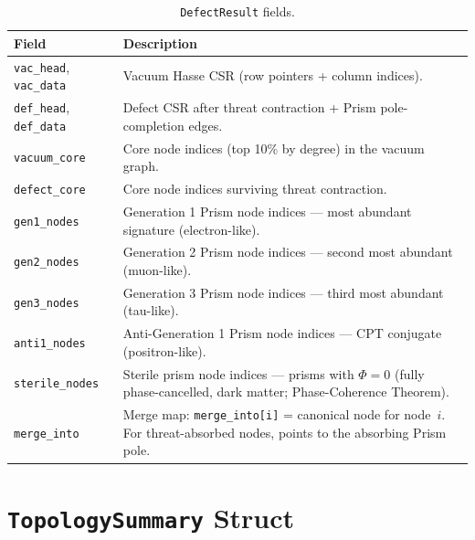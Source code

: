 \documentclass[11pt, a4paper, openany]{book}
\newcommand{\code}[1]{\texttt{#1}}
\begin{document}
\begin{table}[H]
\centering
\begin{tabular}{@{} l p{9cm} @{}}
\toprule
\textbf{Field} & \textbf{Description} \\
\midrule
\code{vac\_head}, \code{vac\_data}   & Vacuum Hasse CSR (row pointers + column indices). \\
\code{def\_head}, \code{def\_data}   & Defect CSR after threat contraction + Prism pole-completion edges. \\
\code{vacuum\_core}                  & Core node indices (top 10\% by degree) in the vacuum graph. \\
\code{defect\_core}                  & Core node indices surviving threat contraction. \\
\code{gen1\_nodes}                   & Generation 1 Prism node indices --- most abundant signature (electron-like). \\
\code{gen2\_nodes}                   & Generation 2 Prism node indices --- second most abundant (muon-like). \\
\code{gen3\_nodes}                   & Generation 3 Prism node indices --- third most abundant (tau-like). \\
\code{anti1\_nodes}                  & Anti-Generation 1 Prism node indices --- CPT conjugate (positron-like). \\
\code{sterile\_nodes}                & Sterile prism node indices --- prisms with $\Phi = 0$ (fully phase-cancelled, dark matter; Phase-Coherence Theorem). \\
\code{merge\_into}                   & Merge map: \code{merge\_into[i]} = canonical node for node~$i$. For threat-absorbed nodes, points to the absorbing Prism pole. \\
\bottomrule
\end{tabular}
\caption{\code{DefectResult} fields.}
\end{table}

\section{\code{TopologySummary} Struct}
\end{document}
